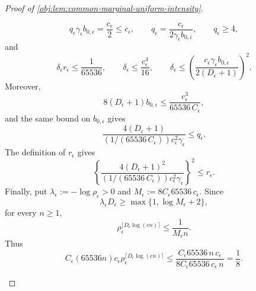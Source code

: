 \begin{proof}[Proof of \cref{obj:lem:common-marginal-uniform-intensity}]
\begin{enumerate}
\[
q_\epsilon\gamma_\epsilon b_{0,\epsilon}
=\frac{c_\epsilon}{2}\le c_\epsilon,\qquad
q_\epsilon=\frac{c_\epsilon}{2\gamma_\epsilon b_{0,\epsilon}},\qquad
q_\epsilon\ge4,
\]
and
\[
\delta_\epsilon r_\epsilon\le\frac1{65536},\qquad
\delta_\epsilon\le\frac{c_\epsilon^4}{16},\qquad
\delta_\epsilon\le
\left(\frac{c_\epsilon\gamma_\epsilon b_{0,\epsilon}}
{2(D_\epsilon+1)}\right)^2 .
\]
Moreover,
\[
8(D_\epsilon+1)b_{0,\epsilon}
\le
\frac{c_\epsilon^3}{65536\,C_\epsilon},
\]
and the same bound on \(b_{0,\epsilon}\) gives
\[
\frac{4(D_\epsilon+1)}
{(1/(65536\,C_\epsilon))c_\epsilon^2\gamma_\epsilon}
\le q_\epsilon .
\]
The definition of \(r_\epsilon\) gives
\[
\left\{
\frac{4(D_\epsilon+1)^2}
{(1/(65536\,C_\epsilon))c_\epsilon^2\gamma_\epsilon}
\right\}^2
\le r_\epsilon .
\]
Finally, put \(\lambda_\epsilon:=-\log\rho_\epsilon>0\) and
\(M_\epsilon:=8C_\epsilon 65536\,c_\epsilon\). Since
\[
\lambda_\epsilon D_\epsilon
\ge \max\{1,\log M_\epsilon+2\},
\]
for every \(n\ge1\),
\[
\rho_\epsilon^{\lceil D_\epsilon\log(en)\rceil}
\le \frac1{M_\epsilon n}.
\]
Thus
\[
C_\epsilon(65536n)c_\epsilon
\rho_\epsilon^{\lceil D_\epsilon\log(en)\rceil}
\le
\frac{C_\epsilon 65536\,n\,c_\epsilon}{8C_\epsilon 65536\,c_\epsilon\,n}
=\frac18 .
\]


\end{enumerate}
\end{proof}
